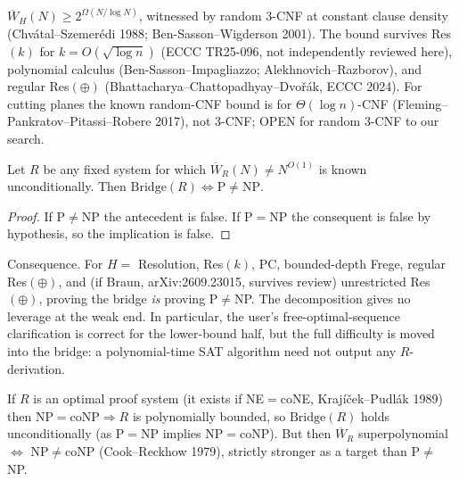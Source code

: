 \documentclass[11pt]{article}
\begin{document}
\begin{theorem}
$\overline W_H(N)\ge 2^{\Omega(N/\log N)}$, witnessed by random 3-CNF at constant clause
density (Chv\'atal--Szemer\'edi 1988; Ben-Sasson--Wigderson 2001). The bound survives
Res$(k)$ for $k=O(\sqrt{\log n})$ (ECCC TR25-096, not independently reviewed here),
polynomial calculus (Ben-Sasson--Impagliazzo; Alekhnovich--Razborov), and regular
Res$(\oplus)$ (Bhattacharya--Chattopadhyay--Dvo\v{r}\'ak, ECCC 2024). For cutting planes the
known random-CNF bound is for $\Theta(\log n)$-CNF (Fleming--Pankratov--Pitassi--Robere 2017),
not 3-CNF; OPEN for random 3-CNF to our search.
\end{theorem}

\begin{theorem}\label{t:collapse}
Let $R$ be any fixed system for which $\overline W_R(N)\ne N^{O(1)}$ is known
unconditionally. Then $\mathrm{Bridge}(R)\iff \mathrm P\ne\mathrm{NP}$.
\end{theorem}
\begin{proof}
If $\mathrm P\neq\mathrm{NP}$ the antecedent is false. If $\mathrm P=\mathrm{NP}$ the
consequent is false by hypothesis, so the implication is false.
\end{proof}
Consequence. For $H=$ Resolution, Res$(k)$, PC, bounded-depth Frege, regular Res$(\oplus)$,
and (if Braun, arXiv:2609.23015, survives review) unrestricted Res$(\oplus)$, proving the
bridge \emph{is} proving P$\ne$NP. The decomposition gives no leverage at the weak end.
In particular, the user's free-optimal-sequence clarification is correct for the
lower-bound half, but the full difficulty is moved into the bridge: a polynomial-time
SAT algorithm need not output any $R$-derivation.

\begin{theorem}\label{t:opt}
If $R$ is an optimal proof system (it exists if NE$=$coNE, Kraj\'i\v{c}ek--Pudl\'ak 1989) then
$\mathrm{NP}=\mathrm{coNP}\Rightarrow R$ is polynomially bounded, so $\mathrm{Bridge}(R)$ holds
unconditionally (as P$=$NP implies NP$=$coNP). But then $\overline W_R$ superpolynomial
$\iff$ NP$\ne$coNP (Cook--Reckhow 1979), strictly stronger as a target than P$\ne$NP.
\end{theorem}
\end{document}
